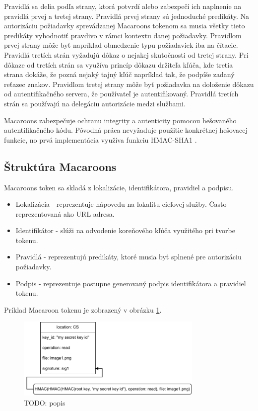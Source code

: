 Pravidlá sa delia podľa strany, ktorá potvrdí alebo zabezpečí ich naplnenie na pravidlá prvej a tretej strany. Pravidlá prvej strany sú jednoduché predikáty. Na autorizáciu požiadavky sprevádzanej Macaroons tokenom sa musia všetky tieto predikáty vyhodnotiť pravdivo v rámci kontextu danej požiadavky. Pravidlom prvej strany môže byť napríklad obmedzenie typu požiadaviek iba na čítacie. Pravidlá tretích strán vyžadujú dôkaz o nejakej skutočnosti od tretej strany. Pri dôkaze od tretích strán sa využíva princíp dôkazu držiteľa kľúča, kde tretia strana dokáže, že pozná nejaký tajný kľúč napríklad tak, že podpíše zadaný reťazec znakov. Pravidlom tretej strany môže byť požiadavka na doloženie dôkazu od autentifikačného servera, že používateľ je autentifikovaný. Pravidlá tretích strán sa používajú na delegáciu autorizácie medzi službami.

Macaroons zabezpečuje ochranu integrity a autenticity pomocou hešovaného autentifikačného kódu. Pôvodná práca \cite{macaroons_paper} nevyžaduje použitie konkrétnej hešovacej funkcie, no prvá implementácia \cite{macaroons_git} využíva funkciu HMAC-SHA1 \cite{hmac_sha1}.

\subsection{Štruktúra Macaroons}

Macaroons token sa skladá z lokalizácie, identifikátora, pravidiel a podpisu. 

\begin{itemize}
    \item Lokalizácia - reprezentuje nápovedu na lokalitu cieľovej služby. Často reprezentovaná ako URL adresa.
    \item Identifikátor - slúži na odvodenie koreňového kľúča využitého pri tvorbe tokenu.
    \item Pravidlá - reprezentujú predikáty, ktoré musia byť splnené pre autorizáciu požiadavky.
    \item Podpis - reprezentuje postupne generovaný podpis identifikátora a pravidiel tokenu.
\end{itemize}

Príklad Macaroon tokenu je zobrazený v obrázku \ref{fig:macaroon_example}.


\begin{figure}
    \centerline{\includegraphics[width=0.8\textwidth]{images/basic_macaroon}}
    \caption[Macaroons token]{TODO: popis}
    \label{fig:macaroon_example}
\end{figure}

